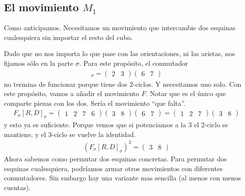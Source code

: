 \documentclass{article}
\theoremstyle{definition}
\newcommand{\comillas}[1]{``#1''}
\begin{document}
\subsection[M1]{El movimiento $M_1$}
Como anticipamos. Necesitamos un movimiento que intercambie dos esquinas cualesquiera sin importar el resto del cubo.

Dado que no nos importa lo que pase con las orientaciones, ni las aristas, nos fijamos sólo en la parte $\sigma$. Para este propósito, el conmutador
\begin{align*}
    [R,D]_\sigma=\begin{pmatrix}
                     2 & 3
                 \end{pmatrix}\begin{pmatrix}
                                  6 & 7
                              \end{pmatrix}
\end{align*}
no termina de funcionar porque tiene dos 2-ciclos. Y necesitamos uno solo. Con este propósito, vamos a añadir el movimiento $F$. Notar que es el único que comparte piezas con los dos. Sería el movimiento \comillas{que falta}.
\begin{align*}
    F_\sigma[R,D]_\sigma=\begin{pmatrix}
                             1 & 2 & 7 & 6
                         \end{pmatrix}\begin{pmatrix}
                                          3 & 8
                                      \end{pmatrix}\begin{pmatrix}
                                                       6 & 7
                                                   \end{pmatrix}=\begin{pmatrix}
                                                                     1 & 2 & 7
                                                                 \end{pmatrix}\begin{pmatrix}
                                                                                  3 & 8
                                                                              \end{pmatrix}
\end{align*}
y esto ya es suficiente. Porque vemos que si potenciamos a la $3$ el 2-ciclo se mantiene, y el 3-ciclo se vuelve la identidad.
\begin{align*}
    \left(F_\sigma[R,D]_\sigma\right)^3=\begin{pmatrix}
                                            3 & 8
                                        \end{pmatrix}
\end{align*}
Ahora sabemos como permutar dos esquinas concretas. Para permutar dos esquinas cualesquiera, podríamos armar otros movimientos con diferentes conmutadores. Sin embargo hay una variante mas sencilla (al menos con menos cuentas).
\end{document}
